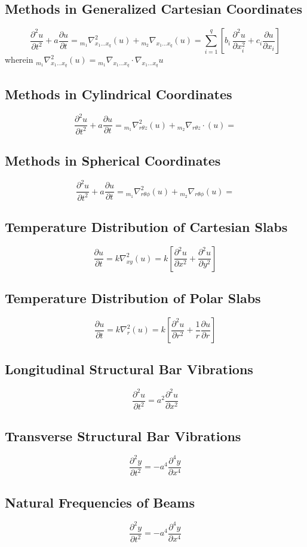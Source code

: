 \documentclass[a4paper, 12pt]{report}
\def\t{\theta}
\def\f{\frac}
\def\l{\left}
\def\r{\right}
\def\dst{\displaystyle}
\def\ph{\phi}
\def\d{\cdot}
\def\p{\partial}
\begin{document}
\begin{center}
\subsection{Methods in Generalized Cartesian Coordinates}
$$\f{\p^2u}{\p t^2} + a\f{\p u}{\p t} = {}_{m_1}\nabla^2_{x_1\dots x_q}(u) + {}_{m_2}\nabla_{x_1\dots x_q}(u) = \sum^{q}_{i=1}\l[b_i\,\f{\p^2u}{\p x^2_{i}} + c_i\f{\p u}{\p x_{i}}\r]$$
wherein $\dst{{}_{m_1}\nabla^2_{x_1\dots x_q}(u) = {}_{m_1}\nabla_{x_1\dots x_q} \d \nabla_{x_1\dots x_q}u}$
\subsection{Methods in Cylindrical Coordinates}
$$\f{\p^2u}{\p t^2} + a\f{\p u}{\p t} = {}_{m_1}\nabla^2_{r\t z}(u) + {}_{m_2}\nabla_{r\t z}\d(u) = $$
\subsection{Methods in Spherical Coordinates}
$$\f{\p^2u}{\p t^2} + a\f{\p u}{\p t} = {}_{m_1}\nabla^2_{r\t\ph}(u) + {}_{m_2}\nabla_{r\t\ph}(u) = $$
\subsection{Temperature Distribution of Cartesian Slabs}
$$\f{\p u}{\p t} = k\nabla^2_{xy}(u) = k\l[\f{\p^2 u}{\p x^2} + \f{\p^2 u}{\p y^2}\r]$$
\subsection{Temperature Distribution of Polar Slabs}
$$\f{\p u}{\p t} = k\nabla^2_{r}(u) = k\l[\f{\p^2 u}{\p r^2} + \f{1}{r}\f{\p u}{\p r}\r]$$
\subsection{Longitudinal Structural Bar Vibrations}
$$\f{\p^2 u}{\p t^2} = a^2\f{\p^2 u}{\p x^2}$$
\subsection{Transverse Structural Bar Vibrations}
$$\f{\p^2 y}{\p t^2} = -a^4\f{\p^4 y}{\p x^4}$$
\subsection{Natural Frequencies of Beams}
$$\f{\p^2 y}{\p t^2} = -a^4\f{\p^4 y}{\p x^4}$$

\end{center}
\end{document}
